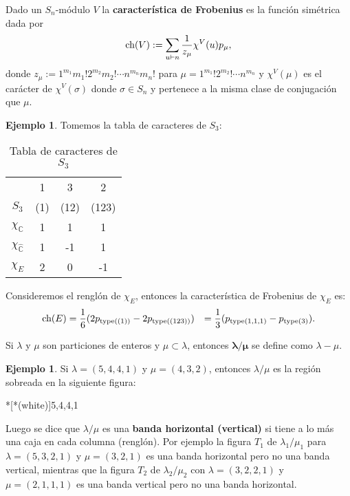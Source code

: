 \documentclass[12pt]{book}
\theoremstyle{definition}
\newtheorem{example}[theorem]{Ejemplo}
\newcounter{in}
\begin{document}
Dado un $S_n$-módulo $V$ la \textbf{característica de Frobenius} es la función simétrica dada por
\begin{equation}
  \label{eq:104}
  \textup{ch}(V) := \sum_{u \vdash n}  \frac{1}{z_{\mu}} \chi^{V}(u) p_{\mu},
\end{equation}
donde $z_{\mu} := 1^{m_1} m_{1}! 2^{m_2} m_{2}! \cdots n^{m_n} m_{n}!$
para $\mu = 1^{m_1} ! 2^{m_2}! \cdots n^{m_n}$ y $\chi^{V}(\mu)$ es el
carácter de $\chi^{V}(\sigma)$ donde $\sigma \in S_n$ y pertenece a la
misma clase de conjugación que $\mu$.
\begin{example}
Tomemos la tabla de caracteres de $S_{3}$:
\begin{table}[H]
  \centering
  \begin{tabular}{ c| c c c}
      & 1 & 3 & 2 \\
      $S_{3}$ & (1) & (12) & (123) \\
      \hline
      $\chi_{\mathbb{C}}$ & 1 & 1 & 1 \\
      $\chi_{\mathbb{\hat C}}$ & 1 & -1 & 1 \\
      $\chi_{E}$ & 2 & 0 & -1 
    \end{tabular}
    
  \caption{Tabla de caracteres de $S_{3}$}
  \label{tabla-car-S3}
\end{table} 
Consideremos el renglón de $\chi_{E}$, entonces la característica de Frobenius de $\chi_{E}$ es:
\begin{equation}
\begin{aligned}
\textup{ch}(E)&=\frac{1}{6}(2p_{\textup{type}((1))}-2p_{\textup{type}((123))})
& = \frac{1}{3}(p_{\textup{type}(1,1,1)}-p_{\textup{type}(3)}).
\end{aligned}
\end{equation} 
\end{example}
Si $\lambda$ y $\mu$ son particiones de enteros y $\mu \subset \lambda$, entonces $\boldsymbol{\lambda / \mu}$ se define como $\lambda-\mu$. 
\begin{example}
Si $\lambda = (5,4,4,1)$ y $\mu = (4,3,2)$, entonces $\lambda / \mu$ es la región sobreada en la siguiente figura:
\begin{center}%
*[*(white)]{5,4,4,1} 
\end{center}
\end{example}
Luego se dice que $\lambda / \mu$ es una \textbf{banda horizontal (vertical)} si tiene a lo más una caja en cada columna (renglón). Por ejemplo la figura $T_{1}$ de $\lambda_{1} / \mu_{1}$ para $\lambda = (5,3,2,1)$ y $\mu = (3,2,1)$ es una banda horizontal pero no una banda vertical, mientras que la figura $T_{2}$ de $\lambda_{2} / \mu_{2}$ con $\lambda = (3,2,2,1)$ y $\mu = (2,1,1,1)$ es una banda vertical pero no una banda horizontal.
\end{document}
